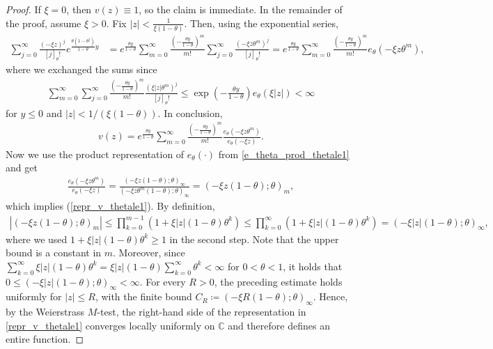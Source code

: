 \documentclass[10pt,a4paper]{amsart}
\newcommand{\C}{\mathbb{C}} %
\newcommand{\1}{\mathds{1}}
\begin{document}
\begin{proof}
If $\xi=0$, then $v(z)\equiv1$, so the claim is immediate.
In the remainder of the proof, assume $\xi>0$. Fix $|z|<\frac{1}{\xi(1-\theta)}$.  
Then, using the exponential series,
\begin{align*}
    \sum_{j=0}^\infty \frac{(-\xi z)^{j}}{[j]_\theta!}e^{\frac{\theta(1-\theta^j)}{1-\theta}y}
    &=e^{\frac{\theta y}{1-\theta}}\sum_{m=0}^\infty\frac{\left(-\frac{\theta y}{1-\theta}\right)^m}{m!}\sum_{j=0}^\infty \frac{(-\xi z\theta^m)^{j}}{[j]_\theta!}
    =e^{\frac{\theta y}{1-\theta}}\sum_{m=0}^\infty\frac{\left(-\frac{\theta y}{1-\theta}\right)^m}{m!}e_\theta(-\xi z\theta^m),
\end{align*}
where we exchanged the sums since 
\begin{align*}
    \sum_{m=0}^\infty\sum_{j=0}^\infty
    \frac{\left(-\frac{\theta y}{1-\theta}\right)^m}{m!}
    \frac{(\xi|z|\theta^m)^j}{[j]_\theta!}
    \leq\exp\left(-\frac{\theta y}{1-\theta}\right)e_\theta(\xi|z|)
    <\infty
\end{align*}
for $y\le 0$ and $|z|<1/(\xi(1-\theta))$.
In conclusion, 
\begin{align*}
    v(z)=e^{\frac{\theta y}{1-\theta}}\sum_{m=0}^\infty\frac{\left(-\frac{\theta y}{1-\theta}\right)^m}{m!}\frac{e_\theta(-\xi z\theta^m)}{e_\theta(-\xi z)}.
\end{align*}
Now we use the product representation of $e_\theta(\cdot)$ from \eqref{e_theta_prod_thetale1} and get
\begin{align*}
    \frac{e_\theta(-\xi z\theta^m)}{e_\theta(-\xi z)}
    =\frac{(-\xi z(1-\theta);\theta)_\infty}{(-\xi z\theta^m(1-\theta);\theta)_\infty}
    =(-\xi z(1-\theta);\theta)_m,
\end{align*}
which implies (\ref{repr_v_thetale1}).
By definition,
\begin{align*}
    |(-\xi z(1-\theta);\theta)_m|
    \le\prod_{k=0}^{m-1}(1+\xi|z|(1-\theta)\theta^k)
    \le\prod_{k=0}^{\infty}(1+\xi|z|(1-\theta)\theta^k)
   \! =\!(-\xi |z|(1-\theta);\theta)_\infty,
\end{align*}
where we used $1+\xi|z|(1-\theta)\theta^k\ge 1$ in the second step. Note that the upper bound is a constant in $m$. Moreover, since $\sum_{k=0}^\infty\xi|z|(1-\theta)\theta^k=\xi|z|(1-\theta)\sum_{k=0}^\infty\theta^k<\infty$ for $0<\theta<1$, it holds that $0\le (-\xi |z|(1-\theta);\theta)_\infty<\infty$. For every $R>0$, the preceding estimate holds uniformly for $|z|\leq R$, with the finite bound
$C_R\coloneqq(-\xi R(1-\theta);\theta)_\infty$. Hence, by the Weierstrass $M$-test, the right-hand side of the representation in \eqref{repr_v_thetale1} converges locally uniformly on $\C$ and therefore defines an entire function.
\end{proof}
\end{document}
